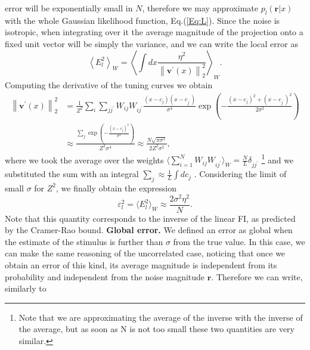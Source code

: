 \documentclass[a4paper]{article}%
\begin{document}
error will be exponentially small in $N$, therefore we may approximate  $p_{l}
(\mathbf{r}|x)$
with the whole Gaussian likelihood function, Eq.(\ref{Eq:L}). Since the noise is isotropic, when integrating over it the
average magnitude of the projection onto a fixed unit vector will be simply
the variance, and we can write the local error as
\begin{equation}
\left\langle E_{l}^{2}\right\rangle_{W} = \left\langle\int dx \frac{\eta^{2}
}{\left\|  \mathbf{v^{\prime}}(x)\right\| _{2}^{2}}\right\rangle_{W}.
\end{equation}
Computing the derivative of the tuning curves we obtain
\begin{equation}
\begin{split}
\left\|  \mathbf{v^{\prime}}(x)\right\| _{2}^{2}  & = \frac{1}{Z^{2}} \sum_{i}
\sum_{jj^{\prime}} W_{ij}W_{ij^{\prime}}\frac{(x-c_{j})(x-c_{j^{\prime}}
)}{\sigma^{4}} \exp\left(-\frac{(x-c_{j})^{2}+(x-c_{j^{\prime}})^{2}}
{2\sigma^{2}}\right)\\
&  \approx\frac{\sum_{j}\exp\left(-\frac{(x-c_{j})^{2}}{\sigma^{2}}
\right) }{Z^{2}\sigma^{4}}\approx\frac{N \sqrt{\pi\sigma^{2}}}{2 Z^{2}\sigma
^{2}},
\end{split}
\label{Eq:tcd}
\end{equation}
where we took the average over the weights $\langle\sum_{i=1}^{N}
W_{ij}W_{ij^{\prime}}\rangle_{W} = \frac{N}{L} \delta_{jj^{\prime}}$
\footnote{Note that we are approximating the average of the inverse with the
inverse of the average, but as soon as N is not too small these two quantities
are very similar.} and we substituted the sum with an integral $\sum_{j}
\approx\frac{1}{L}\int dc_{j}$ . Considering the limit of small $\sigma$ for $Z^{2}$, we finally
obtain the expression
\begin{equation}
\varepsilon_l^2 = \langle E _{l}^{2}\rangle_{W} \approx\frac{2\sigma^{2}\eta^{2}}{N}.
\end{equation}
Note that this quantity corresponds to the inverse of the linear FI, as
predicted by the Cramer-Rao bound.
\newline\newline
\textbf{Global error.} We defined
an error as global when the estimate of the stimulus is further than $\sigma$
from the true value. In this case, we can make the same reasoning of the
uncorrelated case, noticing that once we obtain an error of this kind, its
average magnitude is independent from its probability and independent from
the noise magnitude $\mathbf{r}$. Therefore we can write, similarly to
\end{document}
